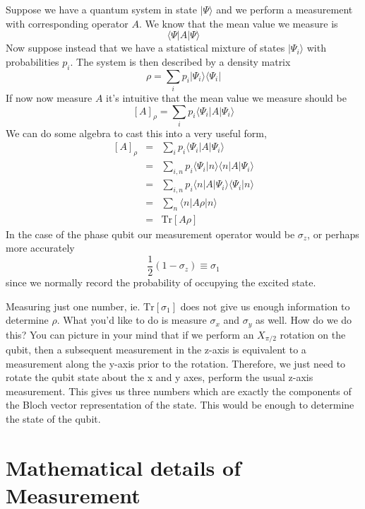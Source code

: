 \documentclass[twocolumn,english,aps,prl]{revtex4}
\newcommand{\bra}[1]{\langle #1|}
\newcommand{\ket}[1]{|#1\rangle}
\newcommand{\braket}[2]{\langle #1|#2\rangle}
\begin{document}
Suppose we have a quantum system in state $\ket{\Psi}$ and we perform a measurement with corresponding operator $A$. We know that the mean value we measure is \begin{equation}
\bra{\Psi}A\ket{\Psi} \end{equation}
Now suppose instead that we have a statistical mixture of states $\ket{\Psi_i}$ with probabilities $p_i$. The system is then described by a density matrix \begin{equation}
\rho = \sum_i p_i \ket{\Psi_i}\bra{\Psi_i} \end{equation}
If now now measure $A$ it's intuitive that the mean value we measure should be \begin{equation}
\left[ A \right]_{\rho} = \sum_i p_i \bra{\Psi_i}A\ket{\Psi_i} \end{equation}
We can do some algebra to cast this into a very useful form,
\begin{eqnarray}
\left[ A \right]_{\rho} &=& \sum_i p_i \bra{\Psi_i}A\ket{\Psi_i} \\
& = & \sum_{i,n} p_i \braket{\Psi_i}{n}\braket{n}{A|\Psi_i} \\
& = & \sum_{i,n} p_i \braket{n}{A|\Psi_i}\braket{\Psi_i}{n} \\
& = & \sum_n \braket{n}{A\rho|n} \\
& = & \textrm{Tr} \left[ A \rho \right]
\end{eqnarray}
In the case of the phase qubit our measurement operator would be $\sigma_z$, or perhaps more accurately \begin{equation}
\frac{1}{2}\left(1 - \sigma_z \right) \equiv \sigma_1 \label{eq:1StateOperator} \end{equation}
since we normally record the probability of occupying the excited state.

Measuring just one number, ie. $\textrm{Tr} [ \sigma_1 ]$ does not give us enough information to determine $\rho$. What you'd like to do is measure $\sigma_x$ and $\sigma_y$ as well. How do we do this? You can picture in your mind that if we perform an $X_{\pi/2}$ rotation on the qubit, then a subsequent measurement in the z-axis is equivalent to a measurement along the y-axis prior to the rotation. Therefore, we just need to rotate the qubit state about the x and y axes, perform the usual z-axis measurement. This gives us three numbers which are exactly the components of the Bloch vector representation of the state. This would be enough to determine the state of the qubit.

\section{Mathematical details of Measurement}
\end{document}
